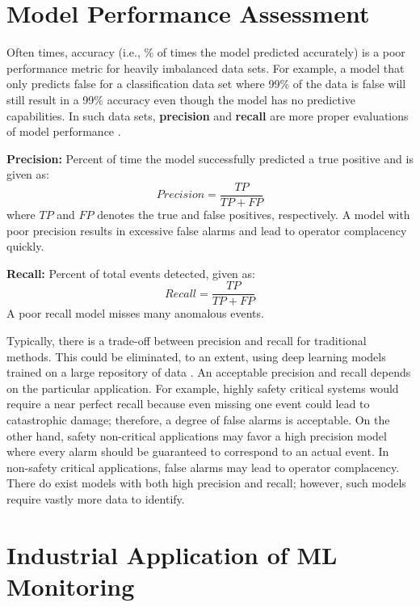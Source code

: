 \section{Model Performance Assessment}
Often times, accuracy (i.e., \% of times the model predicted accurately) is a poor performance metric for heavily imbalanced data sets.  For example, a model that only predicts false for a classification data set where 99\% of the data is false will still result in a 99\% accuracy even though the model has no predictive capabilities. In such data sets, \textbf{precision} and \textbf{recall} are more proper evaluations of model performance \cite{prec_recall}.

\textbf{Precision:} Percent of time the model successfully predicted a true positive and is given as:
\begin{equation}
    Precision = \frac{TP}{TP + FP}
\end{equation}
where $TP$ and $FP$ denotes the true and false positives, respectively. A model with poor precision results in excessive false alarms and lead to operator complacency quickly.  

\textbf{Recall:} Percent of total events detected, given as:
\begin{equation}
    Recall = \frac{TP}{TP + FP}
\end{equation}
A poor recall model misses many anomalous events.

Typically, there is a trade-off between precision and recall for traditional methods. This could be eliminated, to an extent, using deep learning models trained on a large repository of data \cite{deeplearning_course}.  An acceptable precision and recall depends on the particular application.  For example, highly safety critical systems would require a near perfect recall because even missing one event could lead to catastrophic damage; therefore, a degree of false alarms is acceptable.  On the other hand, safety non-critical applications may favor a high precision model where every alarm should be guaranteed to correspond to an actual event. In non-safety critical applications, false alarms may lead to operator complacency. There do exist models with both high precision and recall; however, such models require vastly more data to identify.



\section{Industrial Application of ML Monitoring}

